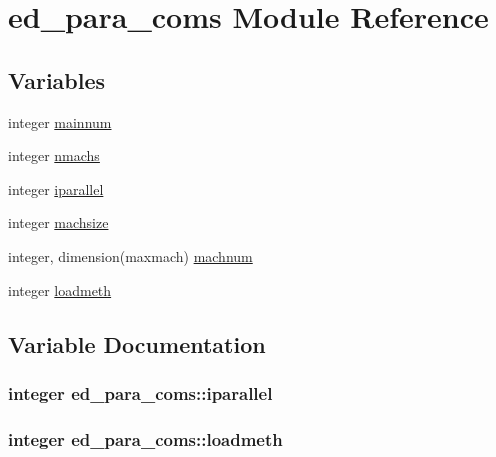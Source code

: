 \hypertarget{namespaceed__para__coms}{}\section{ed\+\_\+para\+\_\+coms Module Reference}
\label{namespaceed__para__coms}
\subsection*{Variables}
\begin{DoxyCompactItemize}
\item 
integer \hyperlink{namespaceed__para__coms_a1a6297adee3ed24d243e8acdc8a47ea9}{mainnum}
\item 
integer \hyperlink{namespaceed__para__coms_a19b6021232603bcc102754344756972d}{nmachs}
\item 
integer \hyperlink{namespaceed__para__coms_a86ef5c2ee27a88377558d7bce3256066}{iparallel}
\item 
integer \hyperlink{namespaceed__para__coms_ac54b6ab59f73c004e11f26ed942382c6}{machsize}
\item 
integer, dimension(maxmach) \hyperlink{namespaceed__para__coms_a38ed61f526634d9930f8f93a6a65cba4}{machnum}
\item 
integer \hyperlink{namespaceed__para__coms_a3ad2033c27d55eca30c6ce0e80c50274}{loadmeth}
\end{DoxyCompactItemize}


\subsection{Variable Documentation}
\hypertarget{namespaceed__para__coms_a86ef5c2ee27a88377558d7bce3256066}{}
\subsubsection[{iparallel}]{\setlength{\rightskip}{0pt plus 5cm}integer ed\+\_\+para\+\_\+coms\+::iparallel}\label{namespaceed__para__coms_a86ef5c2ee27a88377558d7bce3256066}
\hypertarget{namespaceed__para__coms_a3ad2033c27d55eca30c6ce0e80c50274}{}
\subsubsection[{loadmeth}]{\setlength{\rightskip}{0pt plus 5cm}integer ed\+\_\+para\+\_\+coms\+::loadmeth}\label{namespaceed__para__coms_a3ad2033c27d55eca30c6ce0e80c50274}
\hypertarget{namespaceed__para__coms_a38ed61f526634d9930f8f93a6a65cba4}{}
